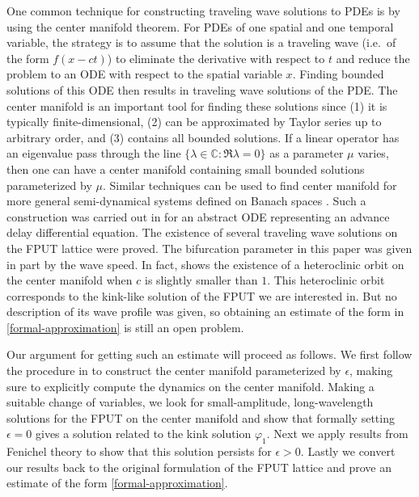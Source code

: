 One common technique for constructing traveling wave solutions to PDEs is by using the center manifold theorem. For PDEs of one spatial and one temporal variable, the strategy is to assume that the solution is a traveling wave (i.e.\ of the form \(f(x-ct)\)) to eliminate the derivative with respect to \(t\) and reduce the problem to an ODE with respect to the spatial variable \(x\). Finding bounded solutions of this ODE then results in traveling wave solutions of the PDE. The center manifold is an important tool for finding these solutions since (1) it is typically finite-dimensional, (2) can be approximated by Taylor series up to arbitrary order, and (3) contains all bounded solutions. If a linear operator has an eigenvalue pass through the line \(\{\lambda\in\mathbb C: \Re \lambda = 0\}\) as a parameter \(\mu\) varies, then one can have a center manifold containing small bounded solutions parameterized by \(\mu\). Similar techniques can be used to find center manifold for more general semi-dynamical systems defined on Banach spaces \cite{vanderbauwhede1992center}. Such a construction was carried out in \cite{iooss2000travelling} for an abstract ODE representing an advance delay differential equation. The existence of several traveling wave solutions on the FPUT lattice were proved. The bifurcation parameter in this paper was given in part by the wave speed. In fact, \cite[Thm.\ 5]{iooss2000travelling} shows the existence of a heteroclinic orbit on the center manifold when \(c\) is slightly smaller than \(1\). This heteroclinic orbit corresponds to the kink-like solution of the FPUT we are interested in. But no description of its wave profile was given, so obtaining an estimate of the form in \cref{formal-approximation} is still an open problem.


Our argument for getting such an estimate will proceed as follows. We first follow the procedure in \cite{iooss2000travelling}
to construct the center manifold parameterized by \(\epsilon\), making sure to explicitly compute the dynamics on the center manifold. Making a suitable change of variables, we look for small-amplitude, long-wavelength solutions for the FPUT on the center manifold and show that formally setting \(\epsilon = 0\) gives a solution related to the kink solution \(\varphi_1\). Next we apply results from Fenichel theory to show that this solution persists for \(\epsilon> 0\). Lastly we convert our results back to the original formulation of the FPUT lattice and prove an estimate of the form \cref{formal-approximation}.


